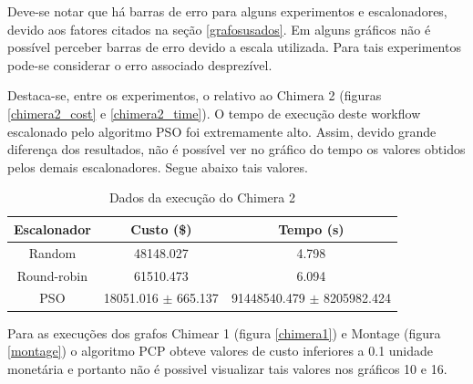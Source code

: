 \documentclass[a4paper,10pt]{article}
\begin{document}
Deve-se notar que há barras de erro para alguns experimentos e escalonadores,
devido aos fatores citados na seção \ref{grafosusados}. Em alguns gráficos não
é possível perceber barras de erro devido a escala utilizada. Para tais experimentos
pode-se considerar o erro associado desprezível.

Destaca-se, entre os experimentos, o relativo ao Chimera 2 (figuras \ref{chimera2_cost} e 
\ref{chimera2_time}). O tempo de execução deste workflow escalonado pelo algoritmo PSO
foi extremamente alto. Assim, devido grande diferença dos
resultados, não é possível ver no gráfico do tempo os valores obtidos pelos demais escalonadores.
Segue abaixo tais valores.

\begin{table}
\centering

  \begin{tabular}{|c|c|c|}  
    \hline
    \textbf{Escalonador} & \textbf{Custo} (\$) & \textbf{Tempo (s)} \\
    \hline
    Random & 48148.027 & 4.798 \\
    \hline
    Round-robin & 61510.473 & 6.094 \\
    \hline
    PSO & 18051.016 $\pm$ 665.137 & 91448540.479 $\pm$ 8205982.424 \\
    \hline

  \end{tabular}
  \caption{Dados da execução do Chimera 2}
  \label{tab:dados_chimera2}
\end{table}

Para as execuções dos grafos Chimear 1 (figura \ref{chimera1}) e Montage (figura \ref{montage})
o algoritmo PCP obteve valores de custo inferiores a 0.1 unidade monetária e
portanto não é possivel visualizar tais valores nos gráficos 10
e 16. 
\end{document}
